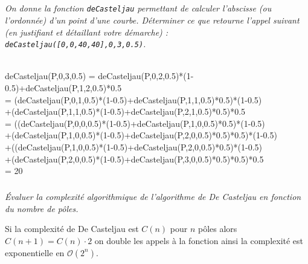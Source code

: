 \documentclass[10pt,fleqn]{article} %
\begin{document}
\subparagraph{}
\textit{On donne la fonction \texttt{deCasteljau} permettant de calculer l'abscisse (ou l'ordonnée) d'un point d'une courbe. Déterminer ce que retourne l'appel suivant (en justifiant et détaillant votre démarche) : ~\\
\texttt{deCasteljau([0,0,40,40],0,3,0.5)}.}
\ifprof
\begin{corrige} ~\\

\noindent deCasteljau(P,0,3,0.5) =  deCasteljau(P,0,2,0.5)*(1-0.5)+deCasteljau(P,1,2,0.5)*0.5 ~\\

\noindent  = (deCasteljau(P,0,1,0.5)*(1-0.5)+deCasteljau(P,1,1,0.5)*0.5)*(1-0.5) ~\\ 
\indent+(deCasteljau(P,1,1,0.5)*(1-0.5)+deCasteljau(P,2,1,0.5)*0.5)*0.5 ~\\

\noindent  = ((deCasteljau(P,0,0,0.5)*(1-0.5)+deCasteljau(P,1,0,0.5)*0.5)*(1-0.5)~\\ 
\indent +(deCasteljau(P,1,0,0.5)*(1-0.5)+deCasteljau(P,2,0,0.5)*0.5)*0.5)*(1-0.5) ~\\ 
\indent+((deCasteljau(P,1,0,0.5)*(1-0.5)+deCasteljau(P,2,0,0.5)*0.5)*(1-0.5)  ~\\
\indent +(deCasteljau(P,2,0,0.5)*(1-0.5)+deCasteljau(P,3,0,0.5)*0.5)*0.5)*0.5 ~\\

\noindent  = 20
\end{corrige}
\else
\fi

\subparagraph{}
\textit{Évaluer la complexité algorithmique de l'algorithme de De Casteljau en fonction du nombre de pôles.}
\ifprof
\begin{corrige}
Si la complexité de De Casteljau est $C(n)$ pour $n$ pôles alors $C(n+1) = C(n) \cdot 2$ on double les appels à la fonction ainsi la complexité est exponentielle en $\mathcal{O}\left(2^n\right)$.
\end{corrige}
\else
\fi
\end{document}
